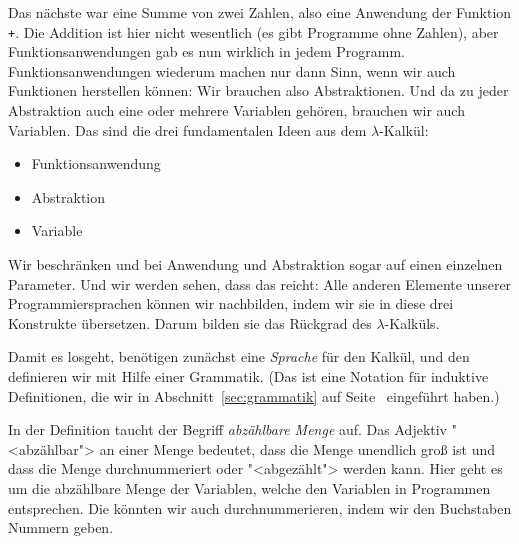 Das nächste war eine Summe von zwei Zahlen, also eine Anwendung der
Funktion \lstinline{+}.  Die Addition ist hier nicht wesentlich (es
gibt Programme ohne Zahlen), aber Funktionsanwendungen gab es nun
wirklich in jedem Programm.  Funktionsanwendungen wiederum machen nur
dann Sinn, wenn wir auch Funktionen herstellen können: Wir brauchen
also Abstraktionen.  Und da zu jeder Abstraktion auch eine oder
mehrere Variablen gehören, brauchen wir auch Variablen.  Das sind die
drei fundamentalen Ideen aus dem $\lambda$-Kalkül:
%
\begin{itemize}
\item Funktionsanwendung
\item Abstraktion
\item Variable
\end{itemize}
%
Wir beschränken und bei Anwendung und Abstraktion sogar auf einen
einzelnen Parameter.  Und wir werden sehen, dass das reicht: Alle
anderen Elemente unserer Programmiersprachen können wir nachbilden,
indem wir sie in diese drei Konstrukte übersetzen.  Darum bilden sie
das Rückgrad des $\lambda$-Kalküls.

Damit es losgeht, benötigen zunächst eine \textit{Sprache} für den
Kalkül, und den definieren wir mit Hilfe einer Grammatik.  (Das ist
eine Notation für induktive Definitionen, die wir in
Abschnitt~\ref{sec:grammatik} auf Seite~\pageref{sec:grammatik}
eingeführt haben.)

In der Definition taucht der Begriff \textit{abzählbare
  Menge} auf.  Das Adjektiv "<abzählbar"> an
einer Menge bedeutet, dass die Menge unendlich groß ist und dass die
Menge durchnummeriert oder "<abgezählt"> werden kann.  Hier geht es um
die abzählbare Menge der Variablen, welche den Variablen in Programmen
entsprechen.  Die könnten wir auch durchnummerieren, indem wir den
Buchstaben Nummern geben.

